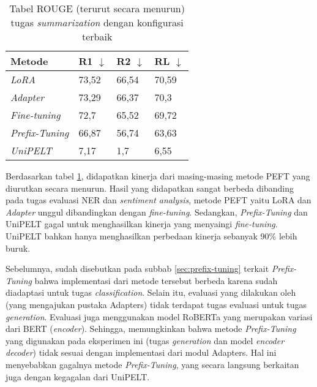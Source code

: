 \begin{table}[h]
    \centering
    \caption{Tabel ROUGE (terurut secara menurun) tugas \textit{summarization} dengan konfigurasi terbaik}
    \label{table:summarization-result-indosum-desc}
    \begin{tabular}{l|lll}
        \toprule
        \textbf{Metode} & \textbf{R1 $\downarrow$} & \textbf{R2 $\downarrow$} & \textbf{RL $\downarrow$} \\
        \midrule
        \textit{LoRA} & 73,52 & 66,54 & 70,59 \\
        \textit{Adapter} & 73,29 & 66,37 & 70,3 \\
        \textit{Fine-tuning} & 72,7 & 65,52 & 69,72 \\
        \textit{Prefix-Tuning} & 66,87 & 56,74 & 63,63 \\
        \textit{UniPELT} & 7,17 & 1,7 & 6,55 \\
        \bottomrule
    \end{tabular}
\end{table}

Berdasarkan tabel \ref{table:summarization-result-indosum-desc}, didapatkan kinerja dari masing-masing metode PEFT yang diurutkan secara menurun. Hasil yang didapatkan sangat berbeda dibanding pada tugas evaluasi NER dan \textit{sentiment analysis}, metode PEFT yaitu LoRA dan \textit{Adapter} unggul dibandingkan dengan \textit{fine-tuning}. Sedangkan, \textit{Prefix-Tuning} dan UniPELT gagal untuk menghasilkan kinerja yang menyaingi \textit{fine-tuning}. UniPELT bahkan hanya menghasilkan perbedaan kinerja sebanyak 90\% lebih buruk.

Sebelumnya, sudah disebutkan pada subbab \ref{sec:prefix-tuning} terkait \textit{Prefix-Tuning} bahwa implementasi dari metode tersebut berbeda karena sudah diadaptasi untuk tugas \textit{classification}. Selain itu, evaluasi yang dilakukan oleh \citeauthor{adapters} (yang mengajukan pustaka Adapters) tidak terdapat tugas evaluasi untuk tugas \textit{generation}. Evaluasi juga menggunakan model RoBERTa yang merupakan variasi dari BERT (\textit{encoder}). Sehingga, memungkinkan bahwa metode \textit{Prefix-Tuning} yang digunakan pada eksperimen ini (tugas \textit{generation} dan model \textit{encoder decoder}) tidak sesuai dengan implementasi dari modul Adapters. Hal ini menyebabkan gagalnya metode \textit{Prefix-Tuning}, yang secara langsung berkaitan juga dengan kegagalan dari UniPELT.
